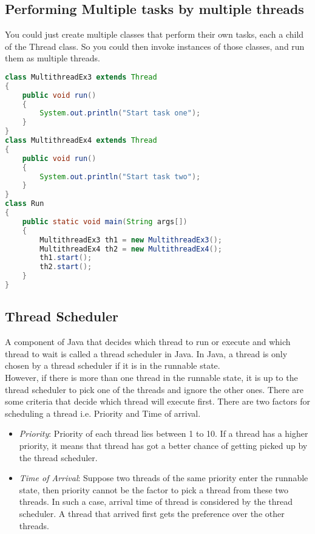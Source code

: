 \documentclass[11pt]{article}
\begin{document}
\subsection{Performing Multiple tasks by multiple threads}
You could just create multiple classes that perform their own tasks, each a child of the Thread class. So you could then invoke instances of those classes, and run them as multiple threads. 

\begin{lstlisting}[language=Java]
class MultithreadEx3 extends Thread  
{  
    public void run()  
    {  
        System.out.println("Start task one");  
    }  
}  
class MultithreadEx4 extends Thread  
{  
    public void run()  
    {  
        System.out.println("Start task two");  
    }  
}  
class Run  
{  
    public static void main(String args[])  
    {  
        MultithreadEx3 th1 = new MultithreadEx3();  
        MultithreadEx4 th2 = new MultithreadEx4();  
        th1.start();  
        th2.start();  
    }  
} 
\end{lstlisting}
\subsection{Thread Scheduler}
A component of Java that decides which thread to run or execute and which thread to wait is called a thread scheduler in Java. In Java, a thread is only chosen by a thread scheduler if it is in the runnable state.\\

However, if there is more than one thread in the runnable state, it is up to the thread scheduler to pick one of the threads and ignore the other ones. There are some criteria that decide which thread will execute first. There are two factors for scheduling a thread i.e. Priority and Time of arrival.

\begin{itemize}
	\item \textit{Priority}: Priority of each thread lies between 1 to 10. If a thread has a higher priority, it means that thread has got a better chance of getting picked up by the thread scheduler.
	
	\item \textit{Time of Arrival}: Suppose two threads of the same priority enter the runnable state, then priority cannot be the factor to pick a thread from these two threads. In such a case, arrival time of thread is considered by the thread scheduler. A thread that arrived first gets the preference over the other threads.
\end{itemize}
\end{document}
